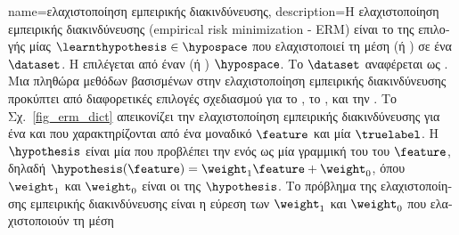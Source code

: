 {name={\foreignlanguage{greek}{ελαχιστοποίηση εμπειρικής διακινδύνευσης}}, 
	description={\foreignlanguage{greek}{Η ελαχιστο\-ποί\-ηση εμπειρικής 
		διακινδύνευσης} 
		(empirical risk minimization - ERM) \foreignlanguage{greek}{είναι το}  \foreignlanguage{greek}{της  
		επιλογής μίας}  $\learnthypothesis \in \hypospace$ \foreignlanguage{greek}{που ελαχιστοποιεί τη}
		\foreignlanguage{greek}{μέση}  (\foreignlanguage{greek}{ή} ) \foreignlanguage{greek}{σε ένα} 
		 $\dataset$. \foreignlanguage{greek}{Η}  \foreignlanguage{greek}{επιλέγεται 
		από έναν}  (\foreignlanguage{greek}{ή} ) $\hypospace$. \foreignlanguage{greek}{Το} 
		 $\dataset$ \foreignlanguage{greek}{αναφέρεται ως} . \foreignlanguage{greek}{Μια πληθώρα 
		μεθόδων}  \foreignlanguage{greek}{βασισμένων στην ελαχιστο\-ποί\-ηση εμπειρικής διακινδύνευσης προκύπτει από
		διαφορετικές επιλογές σχεδιασμού για το} , \foreignlanguage{greek}{το} , 
		\foreignlanguage{greek}{και την}  \cite[\foreignlanguage{greek}{Κεφ.} 3]{MLBasics}.
		\foreignlanguage{greek}{Το Σχ.}\ \ref{fig_erm_dict} \foreignlanguage{greek}{απεικονίζει την ελαχιστοποίηση εμπειρικής διακινδύνευσης 
		για ένα}  \foreignlanguage{greek}{και}  \foreignlanguage{greek}{που χαρακτηρίζονται 
		από ένα μοναδικό}  $\feature$ \foreignlanguage{greek}{και μία}  $\truelabel$. 
		\foreignlanguage{greek}{Η}  $\hypothesis$ \foreignlanguage{greek}{είναι μία}  
		\foreignlanguage{greek}{που προβλέπει την}  \foreignlanguage{greek}{ενός}  
		\foreignlanguage{greek}{ως μία γραμμική}  \foreignlanguage{greek}{του}  
		\foreignlanguage{greek}{του} $\feature$, \foreignlanguage{greek}{δηλαδή $\hypothesis(\feature) = \weight_{1} \feature + \weight_{0}$, 
		όπου $\weight_{1}$ και $\weight_{0}$ είναι οι}  \foreignlanguage{greek}{της} 
		 $\hypothesis$. \foreignlanguage{greek}{Το πρόβλημα της ελαχιστοποίησης εμπειρικής διακινδύνευσης 
		είναι η εύρεση των}  $\weight_{1}$ \foreignlanguage{greek}{και $\weight_{0}$ που ελαχιστοποιούν τη μέση} 
}}
